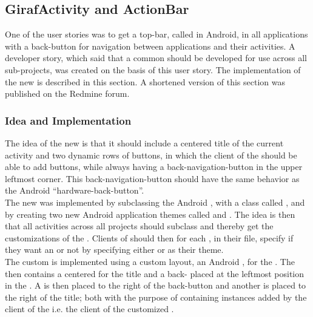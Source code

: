 \subsection{GirafActivity and ActionBar}
\label{sec:giraf_activity_actionbar}

One of the user stories was to get a top-bar, called  in Android, in all applications with a back-button for navigation between applications and their activities. A developer story, which said that a common  should be developed for use across all sub-projects, was created on the basis of this user story. The implementation of the new \giraf {} is described in this section. A shortened version of this section was published on the \giraf Redmine forum\parencite{redmine}.

\subsubsection{Idea and Implementation}

The idea of the new  is that it should include a centered title of the current activity and two dynamic rows of \giraf buttons, in which the client of the  should be able to add buttons, while always having a back-navigation-button in the upper leftmost corner. This back-navigation-button should have the same behavior as the Android ``hardware-back-button''.\\

The new  was implemented by subclassing the Android , with a class called , and by creating two new Android application themes called  and . The idea is then that all activities across all projects should subclass  and thereby get the customizations of the . Clients of  should then for each , in their  file, specify if they want an  or not by specifying either  or  as their theme.\\

The custom  is implemented using a custom layout, an Android , for the . The  then contains a centered  for the title and a back- placed at the leftmost position in the . A  is then placed to the right of the back-button and another  is placed to the right of the title; both with the purpose of containing  instances added by the client of the  i.e. the client of the customized . \\

